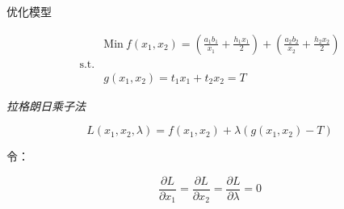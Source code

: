 \documentclass[UTF8]{ctexbeamer}
\begin{document}
\begin{frame}{优化模型}
  
  \begin{block}{}
    \[ 
    \begin{array}{lc}
      & \mbox{Min}\ f(x_1, x_2) = (\frac{a_1 b_1}{x_1} + \frac{h_1 x_1}{2}) + (\frac{a_2 b_2}{x_2} + \frac{h_2 x_2}{2}) \\
      \mbox{s.t.} &  \\
      &
      g(x_1, x_2) = t_1 x_1 + t_2 x_2 = T 
    \end{array}
    \]
  \end{block}

  \emph{拉格朗日乘子法}

  \[
    L(x_1, x_2, \lambda) = f(x_1, x_2) + \lambda (g(x_1, x_2) - T)
  \]

  令：

  \[
    \frac{\partial L}{\partial x_1} = \frac{\partial L}{\partial x_2} = \frac{\partial L}{\partial \lambda} = 0
  \]
  
\end{frame}
\end{document}
